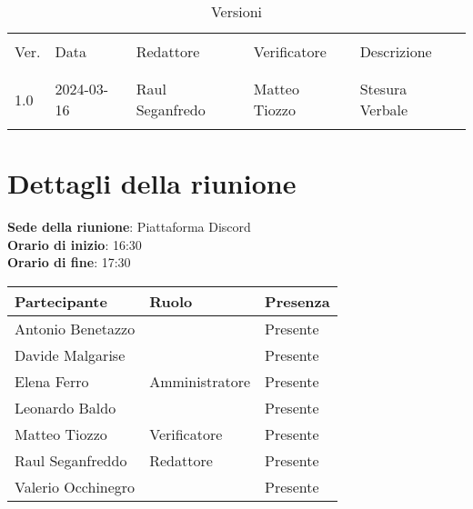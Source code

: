 \documentclass[italian,12pt]{article}
\begin{document}


\newpage



\begin{table}[!h]
	\caption{Versioni}
	\footnotesize
	\begin{center}
		\begin{tabular}{ l l l l p{6cm} }
			\hline                                                                              \\[-2ex]
			Ver. & Data       & Redattore          & Verificatore       & Descrizione           \\
			\\[-2ex] \hline \\[-1.5ex]
			1.0  & 2024-03-16 & Raul Seganfredo    & Matteo Tiozzo & Stesura Verbale \\
			\\[-1.5ex] \hline
		\end{tabular}
	\end{center}
\end{table}

\newpage

\tableofcontents

\newpage

\section{Dettagli della riunione}


\textbf{Sede della riunione}: Piattaforma Discord\\
\textbf{Orario di inizio}: 16:30\\
\textbf{Orario di fine}: 17:30\\


\begin{flushleft}
	\begin{table}[!h]
	\begin{tabular}{ |l|l|l| } 
		\hline
		\textbf{Partecipante} & \textbf{Ruolo}       & \textbf{Presenza} \\
		\hline 
		Antonio Benetazzo     &                      & Presente          \\
		Davide Malgarise      & 			         & Presente          \\
		Elena Ferro           & Amministratore       & Presente          \\
		Leonardo Baldo        &                      & Presente          \\
		Matteo Tiozzo         & Verificatore         & Presente          \\
		Raul Seganfreddo      & Redattore	         & Presente          \\
		Valerio Occhinegro    &                      & Presente          \\
		\hline
	\end{tabular}
	\end{table}
\end{flushleft}
\end{document}
